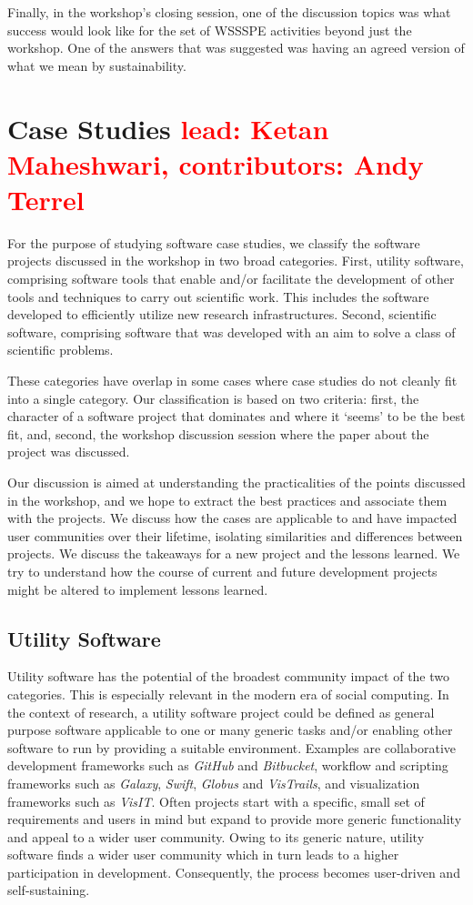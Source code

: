 \documentclass[11pt, oneside]{amsart}
\newcommand{\note}[1]{ {\textcolor{red}    { #1 }}}
\begin{document}
Finally, in the workshop's closing session, one of the discussion topics was
what success would look like for the set of WSSSPE activities beyond just the workshop.
One of the answers that was suggested was
having an agreed version of what we mean by sustainability.


\section{Case Studies \note{lead: Ketan Maheshwari, contributors: Andy Terrel}} \label{sec:use-cases}

For the purpose of studying software case studies, we classify the software
projects discussed in the workshop in two broad categories. First, utility
software, comprising software tools that enable and/or facilitate the
development of other tools and techniques to carry out scientific work. This
includes the software developed to efficiently utilize new research
infrastructures.  Second, scientific software, comprising software that was
developed with an aim to solve a class of scientific problems.

These categories have overlap in some cases where case studies do not cleanly
fit into a single category.  Our classification is based on two criteria:
first, the character of a software project that dominates and where it `seems'
to be the best fit, and, second, the workshop discussion session where the
paper about the project was discussed.

Our discussion is aimed at understanding the practicalities of the points
discussed in the workshop, and we hope to extract the best practices and
associate them with the projects. We discuss how the cases are applicable to
and have impacted user communities over their lifetime, isolating similarities
and differences between projects. We discuss the takeaways for a new
project and the lessons learned. We try to understand how the course of current
and future development projects might be altered to implement lessons learned.

\subsection{Utility Software}
Utility software has the potential of the broadest community impact of the two
categories. This is especially relevant in the modern era of social computing.
In the context of research, a utility software project could be defined as
general purpose software applicable to one or many generic tasks and/or
enabling other software to run by providing a suitable environment. Examples
are collaborative development frameworks such as \emph{GitHub} and
\emph{Bitbucket}, workflow and scripting frameworks such as \emph{Galaxy},
\emph{Swift}, \emph{Globus} and \emph{VisTrails}, and visualization frameworks
such as \emph{VisIT}. Often projects start with a specific, small set of
requirements and users in mind but expand to provide more generic functionality
and appeal to a wider user community. Owing to its generic nature, utility
software finds a wider user community which in turn leads to a higher
participation in development. Consequently, the process becomes user-driven and
self-sustaining.
\end{document}
